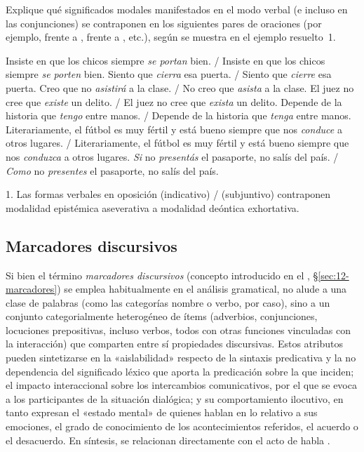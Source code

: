 \begin{ejercicio}\label{ej:14-subjuntivo}
Explique qué significados modales manifestados en el modo verbal (e incluso en
las conjunciones) se contraponen en los siguientes pares de oraciones (por
ejemplo,  frente a ,  frente a , etc.), según se muestra en el
ejemplo resuelto~1.

\begin{exe}
  \ex Insiste en que los chicos siempre \textit{se portan} bien. / Insiste en que
      los chicos siempre \textit{se porten} bien.
  \ex Siento que \textit{cierra} esa puerta. / Siento que \textit{cierre} esa
      puerta.
  \ex Creo que no \textit{asistirá} a la clase. / No creo que \textit{asista} a
      la clase.
  \ex El juez no cree que \textit{existe} un delito. / El juez no cree que
      \textit{exista} un delito.
  \ex Depende de la historia que \textit{tengo} entre manos. / Depende de la
      historia que \textit{tenga} entre manos.
  \ex Literariamente, el fútbol es muy fértil y está bueno siempre que nos
      \textit{conduce} a otros lugares. / Literariamente, el fútbol es muy
      fértil y está bueno siempre que nos \textit{conduzca} a otros lugares.
  \ex \textit{Si} no \textit{presentás} el pasaporte, no salís del país. /
      \textit{Como} no \textit{presentes} el pasaporte, no salís del país.
\end{exe}

\begin{resuelto}
1. Las formas verbales en oposición  (indicativo) / 
(subjuntivo) contraponen modalidad epistémica aseverativa a modalidad deóntica
exhortativa.
\end{resuelto}
\end{ejercicio}

\subsection{Marcadores discursivos}\label{sec:14-marcadores}

Si bien el término \textit{marcadores discursivos} (concepto introducido en el
, §\ref{sec:12-marcadores}) se emplea habitualmente en el análisis
gramatical, no alude a una clase de palabras (como las categorías nombre o verbo,
por caso), sino a un conjunto categorialmente heterogéneo de ítems (adverbios,
conjunciones, locuciones prepositivas, incluso verbos, todos con otras funciones
vinculadas con la interacción) que comparten entre sí propiedades discursivas.
Estos atributos pueden sintetizarse en la «aislabilidad» respecto de la
sintaxis predicativa y la no dependencia del significado léxico que aporta la
predicación sobre la que inciden; el impacto interaccional sobre los intercambios
comunicativos, por el que se evoca a los participantes de la situación
dialógica; y su comportamiento ilocutivo, en tanto expresan el «estado mental»
de quienes hablan en lo relativo a sus emociones, el grado de conocimiento de los
acontecimientos referidos, el acuerdo o el desacuerdo. En síntesis, se
relacionan directamente con el acto de habla \parencite{sanchezlopez2020}.

